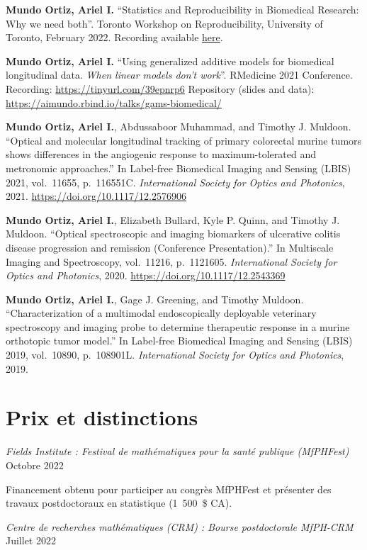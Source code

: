 \documentclass[10pt,]{article}
\begin{document}
\textbf{Mundo Ortiz, Ariel I.} ``Statistics and Reproducibility in
Biomedical Research: Why we need both''. Toronto Workshop on
Reproducibility, University of Toronto, February 2022. Recording
available \href{https://www.youtube.com/watch?v=Fvkp20X5xwA}{here}.

\textbf{Mundo Ortiz, Ariel I.} ``Using generalized additive models for
biomedical longitudinal data. \emph{When linear models don't work}''.
RMedicine 2021 Conference. Recording: \url{https://tinyurl.com/39epnrp6}
Repository (slides and data):
\url{https://aimundo.rbind.io/talks/gams-biomedical/}

\textbf{Mundo Ortiz, Ariel I.}, Abdussaboor Muhammad, and Timothy J.
Muldoon. ``Optical and molecular longitudinal tracking of primary
colorectal murine tumors shows differences in the angiogenic response to
maximum-tolerated and metronomic approaches.'' In Label-free Biomedical
Imaging and Sensing (LBIS) 2021, vol.~11655, p.~116551C.
\emph{International Society for Optics and Photonics}, 2021.
\url{https://doi.org/10.1117/12.2576906}

\textbf{Mundo Ortiz, Ariel I.}, Elizabeth Bullard, Kyle P. Quinn, and
Timothy J. Muldoon. ``Optical spectroscopic and imaging biomarkers of
ulcerative colitis disease progression and remission (Conference
Presentation).'' In Multiscale Imaging and Spectroscopy, vol.~11216,
p.~1121605. \emph{International Society for Optics and Photonics}, 2020.
\url{https://doi.org/10.1117/12.2543369}

\textbf{Mundo Ortiz, Ariel I.}, Gage J. Greening, and Timothy Muldoon.
``Characterization of a multimodal endoscopically deployable veterinary
spectroscopy and imaging probe to determine therapeutic response in a
murine orthotopic tumor model.'' In Label-free Biomedical Imaging and
Sensing (LBIS) 2019, vol.~10890, p.~108901L. \emph{International Society
for Optics and Photonics}, 2019.

\section{Prix et distinctions}\label{prix-et-distinctions}

\emph{Fields Institute : Festival de mathématiques pour la santé
publique (MfPHFest)} \hfill Octobre 2022

Financement obtenu pour participer au congrès MfPHFest et présenter des
travaux postdoctoraux en statistique (1~500~\$ CA).

\emph{Centre de recherches mathématiques (CRM) : Bourse postdoctorale
MfPH-CRM} \hfill Juillet 2022
\end{document}
